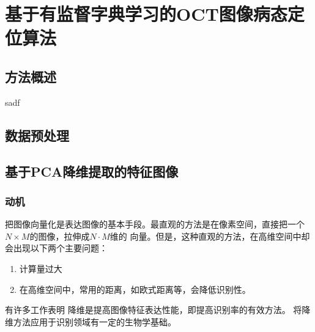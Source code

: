 \chapter{基于有监督字典学习的OCT图像病态定位算法}

\section{方法概述} %
\label{sec:methodOverview}
sadf 

\section{数据预处理}
\label{sec:Preprocessing}

\section{基于PCA降维提取的特征图像}
\label{sec:pcaDR}
    \subsection{动机}
    把图像向量化是表达图像的基本手段。最直观的方法是在像素空间，直接把一个$N \times M$的图像，拉伸成$N\cdot M$维的 向量。但是，这种直观的方法，在高维空间中却会出现以下两个主要问题：
    \begin{enumerate}
        \item 计算量过大
        \item 在高维空间中，常用的距离，如欧式距离等，会降低识别性。
    \end{enumerate}
    有许多工作表明%
    降维是提高图像特征表达性能，即提高识别率的有效方法。
    将降维方法应用于识别领域有一定的生物学基础。

